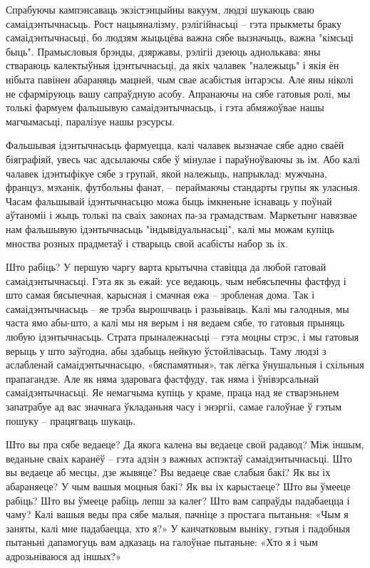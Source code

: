 Спрабуючы кампэнсаваць экзістэнцыйны вакуум, людзі шукаюць сваю самаідэнтычнасьць. Рост нацыяналізму, рэлігійнасьці – гэта прыкметы браку самаідэнтычнасьці, бо людзям жыцьцёва важна сябе вызначыць, важна "кімсьці быць". Прамысловыя брэнды, дзяржавы, рэлігіі дзеюць аднолькава: яны ствараюць калектыўныя ідэнтычнасьці, да якіх чалавек "належыць" і якія ён нібыта павінен абараняць мацней, чым свае асабістыя інтарэсы. Але яны ніколі не сфарміруюць вашу сапраўдную асобу. Апранаючы на сябе гатовыя ролі, мы толькі фармуем фальшывую самаідэнтычнасьць, і гэта абмяжоўвае нашы магчымасьці, паралізуе нашы рэсурсы.

Фальшывая ідэнтычнасьць фармуецца, калі чалавек вызначае сябе адно сваёй біяграфіяй, увесь час адсылаючы сябе ў мінулае і параўноўваючы зь ім. Або калі чалавек ідэнтыфікуе сябе з групай, якой належыць, напрыклад: мужчына, француз, мэханік, футбольны фанат, – пераймаючы стандарты групы як уласныя. Часам фальшывай ідэнтычнасьцю можа быць імкненьне існаваць у поўнай аўтаноміі і жыць толькі па сваіх законах па-за грамадствам. Маркетынг навязвае нам фальшывую ідэнтычнасьць "індывідуальнасьці", калі мы можам купіць мноства розных прадметаў і стварыць свой асабісты набор зь іх.

Што рабіць? У першую чаргу варта крытычна ставіцца да любой гатовай самаідэнтычнасьці. Гэта як зь ежай: усе ведаюць, чым небясьпечны фастфуд і што самая бясьпечная, карысная і смачная ежа – зробленая дома. Так і самаідэнтычнасьць – яе трэба вырошчваць і разьвіваць. Калі мы галодныя, мы часта ямо абы-што, а калі мы ня верым і ня ведаем сябе, то гатовыя прыняць любую ідэнтычнасьць. Страта прыналежнасьці – гэта моцны стрэс, і мы гатовыя верыць у што заўгодна, абы здабыць нейкую ўстойлівасьць. Таму людзі з аслабленай самаідэнтычнасьцю, «бяспамятныя», так лёгка ўнушальныя і схільныя прапагандзе. Але як няма здаровага фастфуду, так няма і ўнівэрсальнай самаідэнтычнасьці. Яе немагчыма купіць у краме, праца над яе стварэньнем запатрабуе ад вас значнага ўкладаньня часу і энэргіі, самае галоўнае ў гэтым пошуку – працягваць шукаць.

Што вы пра сябе ведаеце? Да якога калена вы ведаеце свой радавод? Між іншым, веданьне сваіх каранёў – гэта адзін з важных аспэктаў самаідэнтычнасьці. Што вы ведаеце аб месцы, дзе жывяце? Вы ведаеце свае слабыя бакі? Як вы іх абараняеце? У чым вашыя моцныя бакі? Як вы іх карыстаеце? Што вы ўмееце рабіць? Што вы ўмееце рабіць лепш за калег? Што вам сапраўды падабаецца і чаму? Калі вашыя веды пра сябе малыя, пачніце з простага пытаньня: «Чым я заняты, калі мне падабаецца, хто я?» У канчатковым выніку, гэтыя і падобныя пытаньні дапамогуць вам адказаць на галоўнае пытаньне: «Хто я і чым адрозьніваюся ад іншых?»

